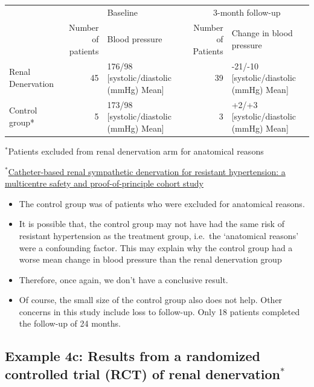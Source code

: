 \documentclass[
]{book}
\providecommand{\tightlist}{%
  \setlength{\itemsep}{0pt}\setlength{\parskip}{0pt}}
\begin{document}
\begin{table}
\centering
\begin{tabular}{l|r|l|r|l}
\hline
\multicolumn{1}{c|}{ } & \multicolumn{2}{c|}{Baseline} & \multicolumn{2}{c}{3-month follow-up} \\
\cline{2-3} \cline{4-5}
  & Number of patients & Blood pressure & Number of Patients & Change in blood pressure\\
\hline
Renal Denervation & 45 & 176/98 [systolic/diastolic (mmHg) Mean] & 39 & -21/-10 [systolic/diastolic (mmHg) Mean]\\
\hline
Control group* & 5 & 173/98 [systolic/diastolic (mmHg) Mean] & 3 & +2/+3 [systolic/diastolic (mmHg) Mean]\\
\hline
\end{tabular}
\end{table}

\(^*\)Patients excluded from renal denervation arm for anatomical reasons

\href{https://www-sciencedirect-com.proxy3.library.mcgill.ca/science/article/pii/S0140673609605663}{\(^*\)Catheter-based renal sympathetic denervation for resistant hypertension: a multicentre safety and proof-of-principle cohort study}

\begin{itemize}
\tightlist
\item
  The control group was of patients who were excluded for anatomical reasons.
\item
  It is possible that, the control group may not have had the same risk of resistant hypertension as the treatment group, i.e.~the `anatomical reasons' were a confounding factor. This may explain why the control group had a worse mean change in blood pressure than the renal denervation group
\item
  Therefore, once again, we don't have a conclusive result.
\item
  Of course, the small size of the control group also does not help. Other concerns in this study include loss to follow-up. Only 18 patients completed the follow-up of 24 months.
\end{itemize}

\hypertarget{example-4c-results-from-a-randomized-controlled-trial-rct-of-renal-denervation}{%
\subsection{\texorpdfstring{Example 4c: Results from a randomized controlled trial (RCT) of renal denervation\(^*\)}{Example 4c: Results from a randomized controlled trial (RCT) of renal denervation\^{}*}}\label{example-4c-results-from-a-randomized-controlled-trial-rct-of-renal-denervation}}
\end{document}
